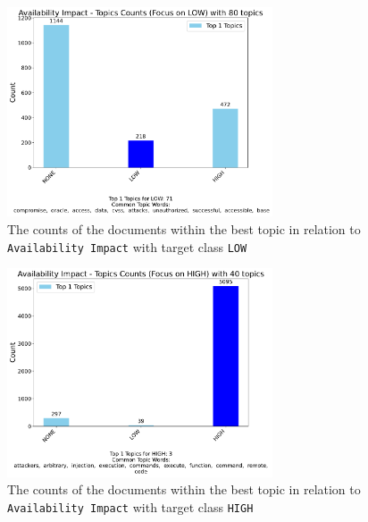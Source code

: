 \documentclass[12pt]{article}
\begin{document}
\begin{figure}[ht]
	\centering
	\includegraphics[width=0.7\textwidth]{figures/availabilityImpact/merged_top_k_topics_category_focus_counts_availabilityImpact_LOW_k1.pdf}
	\caption{The counts of the documents within the best topic in relation to \texttt{Availability Impact} with target class \texttt{LOW}}
	\label{fig:availabilityImpact_60_LOW}
\end{figure}

\begin{figure}[ht]
	\centering
	\includegraphics[width=0.7\textwidth]{figures/availabilityImpact/merged_top_k_topics_category_focus_counts_availabilityImpact_HIGH_k1.pdf}
	\caption{The counts of the documents within the best topic in relation to \texttt{Availability Impact} with target class \texttt{HIGH}}
	\label{fig:availabilityImpact_60_HIGH}
\end{figure}
\end{document}
